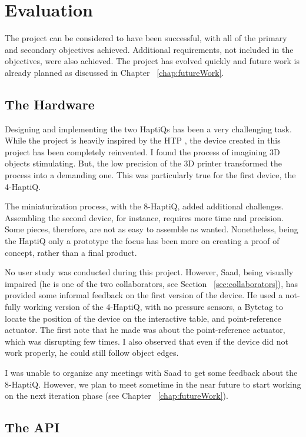 \chapter{Evaluation}

The project can be considered to have been successful, with all of the primary and secondary objectives achieved. Additional requirements, not included in the objectives, were also achieved. The project has evolved quickly and future work is already planned as discussed in Chapter ~\ref{chap:futureWork}. 

\section{The Hardware}

Designing and implementing the two HaptiQs has been a very challenging task. While the project is heavily inspired by the HTP \cite{marquardt2009haptic}, the device created in this project has been completely reinvented. I found the process of imagining 3D objects stimulating. But, the low precision of the 3D printer transformed the process into a demanding one. This was particularly true for the first device, the 4-HaptiQ. 

The miniaturization process, with the 8-HaptiQ, added additional challenges. Assembling the second device, for instance, requires more time and precision. Some pieces, therefore, are not as easy to assemble as wanted. Nonetheless, being the HaptiQ only a prototype the focus has been more on creating a proof of concept, rather than a final product. 

No user study was conducted during this project. However, Saad, being visually impaired (he is one of the two collaborators, see Section ~\ref{sec:collaborators}), has provided some informal feedback on the first version of the device. He used a not-fully working version of the 4-HaptiQ, with no pressure sensors, a Bytetag to locate the position of the device on the interactive table, and point-reference actuator. The first note that he made was about the point-reference actuator, which was disrupting few times. I also observed that even if the device did not work properly, he could still follow object edges.  

I was unable to organize any meetings with Saad to get some feedback about the 8-HaptiQ. However, we plan to meet sometime in the near future to start working on the next iteration phase (see Chapter ~\ref{chap:futureWork}). 

\section{The API}

